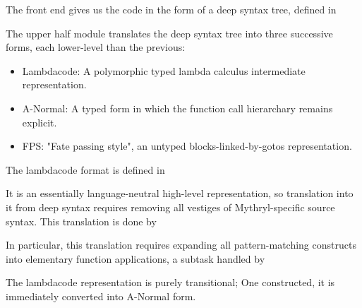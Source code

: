 The front end gives us the code in the form of a 
deep syntax tree, defined in

\begin{quote}
\end{quote}

The upper half module translates the deep syntax tree 
into three successive forms, each lower-level than 
the previous:

\begin{itemize}
\item Lambdacode:  A polymorphic typed lambda calculus intermediate representation.
\item A-Normal:    A typed form in which the function call hierarchary remains explicit.
\item FPS:         "Fate passing style", an untyped blocks-linked-by-gotos representation.
\end{itemize}

The lambdacode format is defined in

\begin{quote}
\end{quote}

It is an essentially language-neutral high-level representation, 
so translation into it from deep syntax requires removing all 
vestiges of Mythryl-specific source syntax.  This translation 
is done by

\begin{quote}
\end{quote}

In particular, this translation requires expanding all pattern-matching 
constructs into elementary function applications, a subtask handled by

\begin{quote}
\end{quote}

The lambdacode representation is purely transitional; 
One constructed, it is immediately converted into A-Normal form.

